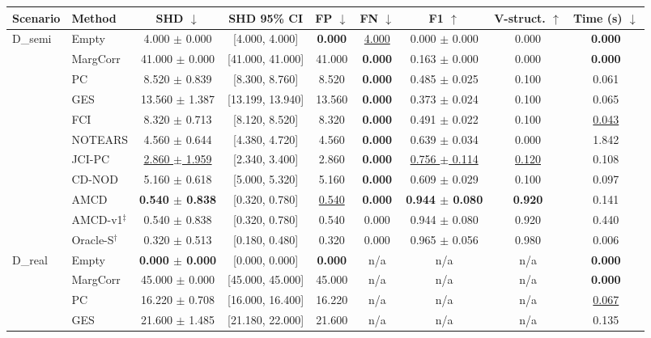 \begin{tabular}{llccccccc}
\toprule
Scenario & Method & SHD $\downarrow$ & SHD 95\% CI & FP $\downarrow$ & FN $\downarrow$ & F1 $\uparrow$ & V-struct. $\uparrow$ & Time (s) $\downarrow$ \\
\midrule
D\_semi & Empty & 4.000 $\pm$ 0.000 & [4.000, 4.000] & \textbf{0.000} & \underline{4.000} & 0.000 $\pm$ 0.000 & 0.000 & \textbf{0.000} \\
 & MargCorr & 41.000 $\pm$ 0.000 & [41.000, 41.000] & 41.000 & \textbf{0.000} & 0.163 $\pm$ 0.000 & 0.000 & \textbf{0.000} \\
 & PC & 8.520 $\pm$ 0.839 & [8.300, 8.760] & 8.520 & \textbf{0.000} & 0.485 $\pm$ 0.025 & 0.100 & 0.061 \\
 & GES & 13.560 $\pm$ 1.387 & [13.199, 13.940] & 13.560 & \textbf{0.000} & 0.373 $\pm$ 0.024 & 0.100 & 0.065 \\
 & FCI & 8.320 $\pm$ 0.713 & [8.120, 8.520] & 8.320 & \textbf{0.000} & 0.491 $\pm$ 0.022 & 0.100 & \underline{0.043} \\
 & NOTEARS & 4.560 $\pm$ 0.644 & [4.380, 4.720] & 4.560 & \textbf{0.000} & 0.639 $\pm$ 0.034 & 0.000 & 1.842 \\
 & JCI-PC & \underline{2.860 $\pm$ 1.959} & [2.340, 3.400] & 2.860 & \textbf{0.000} & \underline{0.756 $\pm$ 0.114} & \underline{0.120} & 0.108 \\
 & CD-NOD & 5.160 $\pm$ 0.618 & [5.000, 5.320] & 5.160 & \textbf{0.000} & 0.609 $\pm$ 0.029 & 0.100 & 0.097 \\
 & AMCD & \textbf{0.540 $\pm$ 0.838} & [0.320, 0.780] & \underline{0.540} & \textbf{0.000} & \textbf{0.944 $\pm$ 0.080} & \textbf{0.920} & 0.141 \\
 & AMCD-v1$^\ddagger$ & 0.540 $\pm$ 0.838 & [0.320, 0.780] & 0.540 & 0.000 & 0.944 $\pm$ 0.080 & 0.920 & 0.440 \\
 & Oracle-S$^\dagger$ & 0.320 $\pm$ 0.513 & [0.180, 0.480] & 0.320 & 0.000 & 0.965 $\pm$ 0.056 & 0.980 & 0.006 \\
D\_real & Empty & \textbf{0.000 $\pm$ 0.000} & [0.000, 0.000] & \textbf{0.000} & n/a & n/a & n/a & \textbf{0.000} \\
 & MargCorr & 45.000 $\pm$ 0.000 & [45.000, 45.000] & 45.000 & n/a & n/a & n/a & \textbf{0.000} \\
 & PC & 16.220 $\pm$ 0.708 & [16.000, 16.400] & 16.220 & n/a & n/a & n/a & \underline{0.067} \\
 & GES & 21.600 $\pm$ 1.485 & [21.180, 22.000] & 21.600 & n/a & n/a & n/a & 0.135 \\

\end{tabular}
